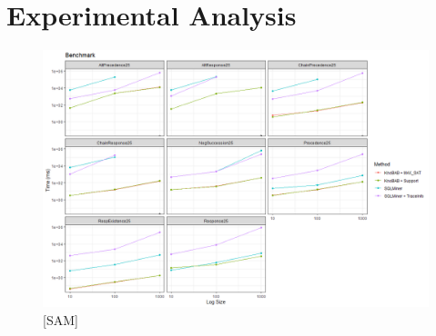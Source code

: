 



\section{Experimental Analysis}\label{sec:exp}
\begin{figure}
\includegraphics[width=.7\textwidth]{images/thumbnail_image.png}
\caption{[SAM]}\label{fig:vsSQL}
\end{figure}

